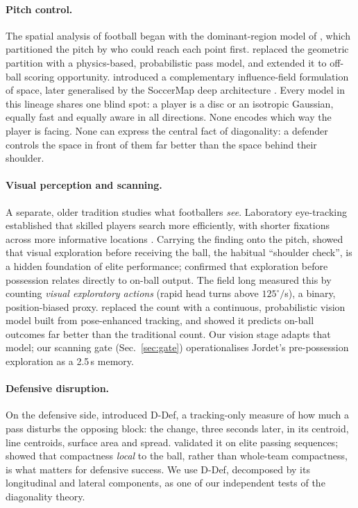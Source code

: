 \documentclass[11pt]{article}
\begin{document}
\paragraph{Pitch control.} The spatial analysis of football began with
the dominant-region model of \citet{taki2000}, which partitioned the pitch
by who could reach each point first. \citet{spearman2017} replaced the
geometric partition with a physics-based, probabilistic pass model, and
\citet{spearman2018} extended it to off-ball scoring opportunity.
\citet{fernandez2018} introduced a complementary influence-field
formulation of space, later generalised by the SoccerMap deep
architecture \citep{fernandez2020soccermap}. Every model in this lineage
shares one blind spot: a player is a disc or an isotropic Gaussian, equally
fast and equally aware in all directions. None encodes which way the
player is facing. None can express the central fact of diagonality:
a defender controls the space in front of them far better than
the space behind their shoulder.

\paragraph{Visual perception and scanning.} A separate, older tradition
studies what footballers \emph{see}. Laboratory eye-tracking established
that skilled players search more efficiently, with shorter fixations
across more informative locations \citep{roca2011,vaeyens2007}. Carrying
the finding onto the pitch, \citet{jordet2013} showed that visual
exploration before receiving the ball, the habitual ``shoulder check'',
is a hidden foundation of elite performance; \citet{mcguckian2018}
confirmed that exploration before possession relates directly to on-ball
output. The field long measured this by counting \emph{visual exploratory
actions} (rapid head turns above $125^\circ/$s), a binary, position-biased
proxy. \citet{bekkers2026} replaced the count with a continuous,
probabilistic vision model built from pose-enhanced tracking, and showed
it predicts on-ball outcomes far better than the traditional count. Our
vision stage adapts that model; our scanning gate (Sec.~\ref{sec:gate})
operationalises Jordet's pre-possession exploration as a 2.5\,s memory.

\paragraph{Defensive disruption.} On the defensive side,
\citet{goes2019} introduced D-Def, a tracking-only measure of how much a
pass disturbs the opposing block: the change, three seconds later, in
its centroid, line centroids, surface area and spread. \citet{forcher2021}
validated it on elite passing sequences; \citet{forcher2024} showed
that compactness \emph{local} to the ball, rather than whole-team
compactness, is what matters for defensive success. We use D-Def, decomposed
by its longitudinal and lateral components, as one of our independent
tests of the diagonality theory.
\end{document}
